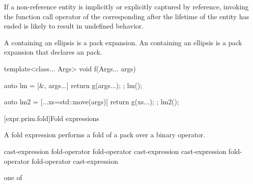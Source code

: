 \pnum
\begin{note}
If a non-reference entity is implicitly or explicitly captured by reference,
invoking the function call operator of the corresponding 
after the lifetime of the entity has ended is likely to result in undefined behavior.
\end{note}

\pnum
A  containing an ellipsis is a pack
expansion.
%
An  containing an ellipsis is a pack
expansion that declares an
 pack.
\begin{example}
\begin{codeblock}
template<class... Args>
void f(Args... args) {
  auto lm = [&, args...] { return g(args...); };
  lm();

  auto lm2 = [...xs=std::move(args)] { return g(xs...); };
  lm2();
}
\end{codeblock}
\end{example}

[expr.prim.fold]{Fold expressions}%

\pnum
A fold expression performs a fold of a
pack over a binary operator.

\begin{bnf}
\br
    \terminal{(} cast-expression fold-operator  \terminal{)}\br
    \terminal{(}  fold-operator cast-expression \terminal{)}\br
    \terminal{(} cast-expression fold-operator  fold-operator cast-expression \terminal{)}
\end{bnf}

\begin{bnf}
 \textnormal{one of}\br
    \terminal{+ }\quad\terminal{- }\quad\terminal{* }\quad\terminal{/ }\quad\terminal{\% }\quad\terminal{\caret{} }\quad\terminal{\& }\quad\terminal{| }\quad\terminal{<< }\quad\terminal{>> }\br
    \terminal{+=}\quad\terminal{-=}\quad\terminal{*=}\quad\terminal{/=}\quad\terminal{\%=}\quad\terminal{\caret=}\quad\terminal{\&=}\quad\terminal{|=}\quad\terminal{<<=}\quad\terminal{>>=}\quad\terminal{=}\br
    \terminal{==}\quad\terminal{!=}\quad\terminal{< }\quad\terminal{> }\quad\terminal{<=}\quad\terminal{>=}\quad\terminal{\&\&}\quad\terminal{||}\quad\terminal{,  }\quad{}\quad\terminal{->*}
\end{bnf}


